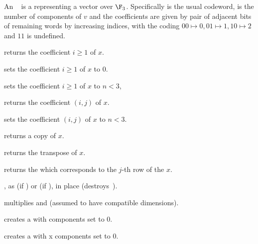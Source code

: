   An ~ is a
 representing a vector over $\F_3$. Specifically  is
the usual codeword,  is the number of components of $v$ and the
coefficients are given by pair of adjacent bits of remaining words by
increasing indices, with the coding $00\mapsto 0, 01\mapsto 1, 10\mapsto 2$ and
$11$ is undefined.

 returns the coefficient $i\ge 1$ of $x$.

 sets the coefficient $i\ge 1$ of $x$ to
$0$.

 sets the coefficient $i\ge 1$ of
$x$ to $n<3$,

 returns the coefficient $(i,j)$
of $x$.

 sets the coefficient
$(i,j)$ of $x$ to $n<3$.

 returns a copy of $x$.

 returns the transpose of $x$.

 returns the  which corresponds
to the $j$-th row of the  $x$.


, as  (if
) or  (if ), in place
(destroys~).

 multiplies   and  (assumed to
have compatible dimensions).




 creates a  with  components set to
$0$.

 creates a  with  x
 components set to $0$.





